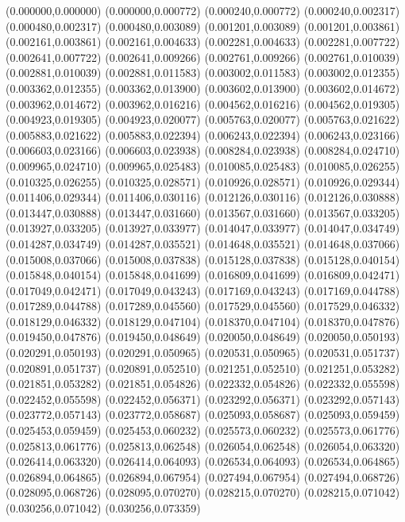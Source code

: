 (0.000000,0.000000)
(0.000000,0.000772)
(0.000240,0.000772)
(0.000240,0.002317)
(0.000480,0.002317)
(0.000480,0.003089)
(0.001201,0.003089)
(0.001201,0.003861)
(0.002161,0.003861)
(0.002161,0.004633)
(0.002281,0.004633)
(0.002281,0.007722)
(0.002641,0.007722)
(0.002641,0.009266)
(0.002761,0.009266)
(0.002761,0.010039)
(0.002881,0.010039)
(0.002881,0.011583)
(0.003002,0.011583)
(0.003002,0.012355)
(0.003362,0.012355)
(0.003362,0.013900)
(0.003602,0.013900)
(0.003602,0.014672)
(0.003962,0.014672)
(0.003962,0.016216)
(0.004562,0.016216)
(0.004562,0.019305)
(0.004923,0.019305)
(0.004923,0.020077)
(0.005763,0.020077)
(0.005763,0.021622)
(0.005883,0.021622)
(0.005883,0.022394)
(0.006243,0.022394)
(0.006243,0.023166)
(0.006603,0.023166)
(0.006603,0.023938)
(0.008284,0.023938)
(0.008284,0.024710)
(0.009965,0.024710)
(0.009965,0.025483)
(0.010085,0.025483)
(0.010085,0.026255)
(0.010325,0.026255)
(0.010325,0.028571)
(0.010926,0.028571)
(0.010926,0.029344)
(0.011406,0.029344)
(0.011406,0.030116)
(0.012126,0.030116)
(0.012126,0.030888)
(0.013447,0.030888)
(0.013447,0.031660)
(0.013567,0.031660)
(0.013567,0.033205)
(0.013927,0.033205)
(0.013927,0.033977)
(0.014047,0.033977)
(0.014047,0.034749)
(0.014287,0.034749)
(0.014287,0.035521)
(0.014648,0.035521)
(0.014648,0.037066)
(0.015008,0.037066)
(0.015008,0.037838)
(0.015128,0.037838)
(0.015128,0.040154)
(0.015848,0.040154)
(0.015848,0.041699)
(0.016809,0.041699)
(0.016809,0.042471)
(0.017049,0.042471)
(0.017049,0.043243)
(0.017169,0.043243)
(0.017169,0.044788)
(0.017289,0.044788)
(0.017289,0.045560)
(0.017529,0.045560)
(0.017529,0.046332)
(0.018129,0.046332)
(0.018129,0.047104)
(0.018370,0.047104)
(0.018370,0.047876)
(0.019450,0.047876)
(0.019450,0.048649)
(0.020050,0.048649)
(0.020050,0.050193)
(0.020291,0.050193)
(0.020291,0.050965)
(0.020531,0.050965)
(0.020531,0.051737)
(0.020891,0.051737)
(0.020891,0.052510)
(0.021251,0.052510)
(0.021251,0.053282)
(0.021851,0.053282)
(0.021851,0.054826)
(0.022332,0.054826)
(0.022332,0.055598)
(0.022452,0.055598)
(0.022452,0.056371)
(0.023292,0.056371)
(0.023292,0.057143)
(0.023772,0.057143)
(0.023772,0.058687)
(0.025093,0.058687)
(0.025093,0.059459)
(0.025453,0.059459)
(0.025453,0.060232)
(0.025573,0.060232)
(0.025573,0.061776)
(0.025813,0.061776)
(0.025813,0.062548)
(0.026054,0.062548)
(0.026054,0.063320)
(0.026414,0.063320)
(0.026414,0.064093)
(0.026534,0.064093)
(0.026534,0.064865)
(0.026894,0.064865)
(0.026894,0.067954)
(0.027494,0.067954)
(0.027494,0.068726)
(0.028095,0.068726)
(0.028095,0.070270)
(0.028215,0.070270)
(0.028215,0.071042)
(0.030256,0.071042)
(0.030256,0.073359)
